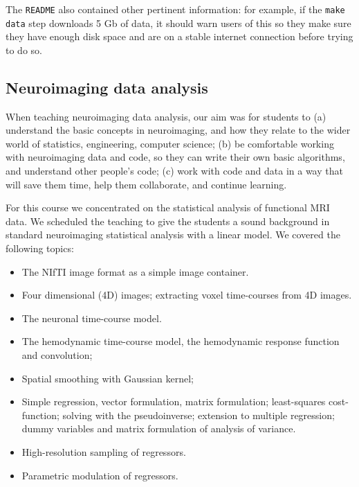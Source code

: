 The \texttt{README} also contained other pertinent information:
for example, if the \texttt{make data} step downloads 5 Gb of data, it should
warn users of this so they make sure they have enough disk space and are on a
stable internet connection before trying to do so.

\subsection{Neuroimaging data analysis}\label{analysis}

When teaching neuroimaging data analysis, our aim was for students to
(a) understand the basic concepts in neuroimaging,
and how they relate to the wider world of statistics, engineering, computer science;
(b) be comfortable working with neuroimaging data and code, so they can write
their own basic algorithms, and understand other people's code;
(c) work with code and data in a way that will save them time, help them collaborate,
and continue learning.%

For this course we concentrated on the statistical analysis of functional MRI
data.  We scheduled the teaching to give the students a sound background in
standard neuroimaging statistical analysis with a linear model.  We covered
the following topics:

\begin{itemize}

\item The NIfTI image format as a simple image container.
\item Four dimensional (4D) images; extracting voxel time-courses from 4D
    images.
\item The neuronal time-course model.
\item The hemodynamic time-course model, the hemodynamic response function and
    convolution;
\item Spatial smoothing with Gaussian kernel;
\item Simple regression, vector formulation, matrix formulation; least-squares
    cost-function; solving with the pseudoinverse; extension to multiple
        regression; dummy variables and matrix formulation of analysis of
        variance.
\item High-resolution sampling of regressors.
\item Parametric modulation of regressors.


\end{itemize}

